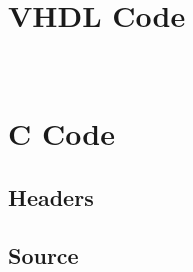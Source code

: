 \documentclass[10pt,a4paper]{article}
\begin{document}
	\clearpage
	\appendix
	\section{\\VHDL Code}
	
	
	\section{\\C Code}
	\subsection{Headers}
	
	
	\subsection{Source}
	
\end{document}
